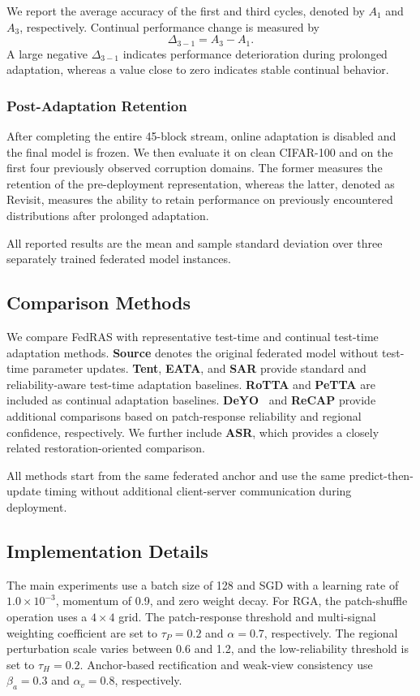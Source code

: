 \documentclass[journal]{IEEEtran}
\begin{document}
We report the average accuracy of the first and third cycles, denoted by $A_1$ and $A_3$, respectively. Continual performance change is measured by
\begin{equation}
\Delta_{3-1} = A_3 - A_1.
\end{equation}
A large negative $\Delta_{3-1}$ indicates performance deterioration during prolonged adaptation, whereas a value close to zero indicates stable continual behavior.

\subsubsection{Post-Adaptation Retention}
After completing the entire 45-block stream, online adaptation is disabled and the final model is frozen. We then evaluate it on clean CIFAR-100 and on the first four previously observed corruption domains. The former measures the retention of the pre-deployment representation, whereas the latter, denoted as Revisit, measures the ability to retain performance on previously encountered distributions after prolonged adaptation.

All reported results are the mean and sample standard deviation over three separately trained federated model instances.

\subsection{Comparison Methods}
We compare FedRAS with representative test-time and continual test-time adaptation methods. \textbf{Source} denotes the original federated model without test-time parameter updates. \textbf{Tent}, \textbf{EATA}, and \textbf{SAR} provide standard and reliability-aware test-time adaptation baselines. \textbf{RoTTA} and \textbf{PeTTA} are included as continual adaptation baselines. \textbf{DeYO~\cite{9}} and \textbf{ReCAP} provide additional comparisons based on patch-response reliability and regional confidence, respectively. We further include \textbf{ASR}, which provides a closely related restoration-oriented comparison.

All methods start from the same federated anchor and use the same predict-then-update timing without additional client-server communication during deployment.

\subsection{Implementation Details}
The main experiments use a batch size of 128 and SGD with a learning rate of $1.0 \times 10^{-3}$, momentum of 0.9, and zero weight decay. For RGA, the patch-shuffle operation uses a $4 \times 4$ grid. The patch-response threshold and multi-signal weighting coefficient are set to $\tau_P = 0.2$ and $\alpha = 0.7$, respectively. The regional perturbation scale varies between 0.6 and 1.2, and the low-reliability threshold is set to $\tau_H = 0.2$. Anchor-based rectification and weak-view consistency use $\beta_a = 0.3$ and $\alpha_v = 0.8$, respectively.
\end{document}
